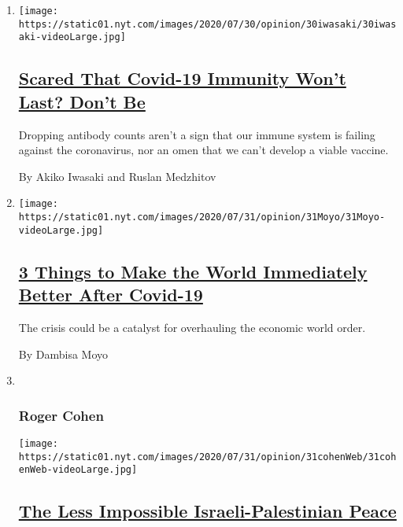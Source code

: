 \begin{enumerate}
\def\labelenumi{\arabic{enumi}.}
\item
  \texttt{[image: https://static01.nyt.com/images/2020/07/30/opinion/30iwasaki/30iwasaki-videoLarge.jpg]}

  \hypertarget{scared-that-covid-19-immunity-wont-last-dont-be}{%
  \subsection{\texorpdfstring{\href{/2020/07/31/opinion/coronavirus-antibodies-immunity.html}{Scared
  That Covid-19 Immunity Won't Last? Don't
  Be}}{Scared That Covid-19 Immunity Won't Last? Don't Be}}\label{scared-that-covid-19-immunity-wont-last-dont-be}}

  Dropping antibody counts aren't a sign that our immune system is
  failing against the coronavirus, nor an omen that we can't develop a
  viable vaccine.

  By Akiko Iwasaki and Ruslan Medzhitov
\item
  \texttt{[image: https://static01.nyt.com/images/2020/07/31/opinion/31Moyo/31Moyo-videoLarge.jpg]}

  \hypertarget{3-things-to-make-the-world-immediately-better-after-covid-19}{%
  \subsection{\texorpdfstring{\href{/2020/07/31/opinion/coronavirus-economy.html}{3
  Things to Make the World Immediately Better After
  Covid-19}}{3 Things to Make the World Immediately Better After Covid-19}}\label{3-things-to-make-the-world-immediately-better-after-covid-19}}

  The crisis could be a catalyst for overhauling the economic world
  order.

  By Dambisa Moyo
\item ~
  \hypertarget{roger-cohen}{%
  \subsubsection{Roger Cohen}\label{roger-cohen}}

  \texttt{[image: https://static01.nyt.com/images/2020/07/31/opinion/31cohenWeb/31cohenWeb-videoLarge.jpg]}

  \hypertarget{the-less-impossible-israeli-palestinian-peace}{%
  \subsection{\texorpdfstring{\href{/2020/07/31/opinion/israeli-palestinian-peace.html}{The
  Less Impossible Israeli-Palestinian
  Peace}}{The Less Impossible Israeli-Palestinian Peace}}\label{the-less-impossible-israeli-palestinian-peace}}


\end{enumerate}
